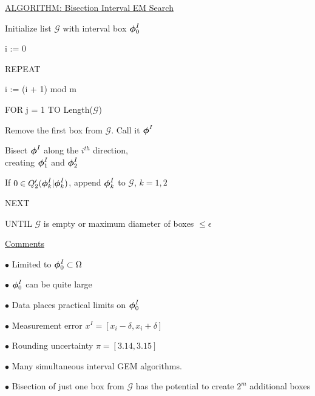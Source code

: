 \documentclass{slides}
\begin{document}
\begin{slide}
\begin{center}
\underline{ALGORITHM: Bisection Interval EM Search}
\end{center}

Initialize list $\mathcal{G}$ with interval box $\mbox{\boldmath $\phi$}^I_0$

i := 0

REPEAT

\quad  i := (i + 1) mod m

\quad  FOR j = 1 TO Length($\mathcal{G}$)
    
\quad \quad Remove the first box from $\mathcal{G}$.  Call it $\mbox{\boldmath $\phi$}^I$

\quad \quad Bisect $\mbox{\boldmath $\phi$}^I$ along the $i^{th}$ direction,\\
\hspace*{1.75cm}creating $\mbox{\boldmath $\phi$}^I_1$ and $\mbox{\boldmath $\phi$}^I_2$

\quad\quad If $0 \in Q'_2(\mbox{\boldmath $\phi$}^I_k|\mbox{\boldmath $\phi$}^I_k)$, append $\mbox{\boldmath $\phi$}^I_k$ to $\mathcal{G}$, $k=1,2$

\quad NEXT

UNTIL $\mathcal{G}$ is empty or maximum diameter of boxes $\leq \epsilon$
\end{slide}

\begin{slide}
\begin{center}
\underline{Comments}
\end{center}
$\bullet$ Limited to $\mbox{\boldmath $\phi$}_0^I \subset \Omega$

$\bullet$ $\mbox{\boldmath $\phi$}_0^I$ can be quite large

$\bullet$ Data places practical limits on $\mbox{\boldmath $\phi$}_0^I$

$\bullet$ Measurement error $x^I = [x_i-\delta, x_i + \delta]$

$\bullet$ Rounding uncertainty $\pi = [3.14, 3.15]$

$\bullet$ Many simultaneous interval GEM algorithms.

$\bullet$ Bisection of just one box from $\mathcal{G}$ has the potential to 
 create $2^m$ additional boxes

\end{slide}
\end{document}
